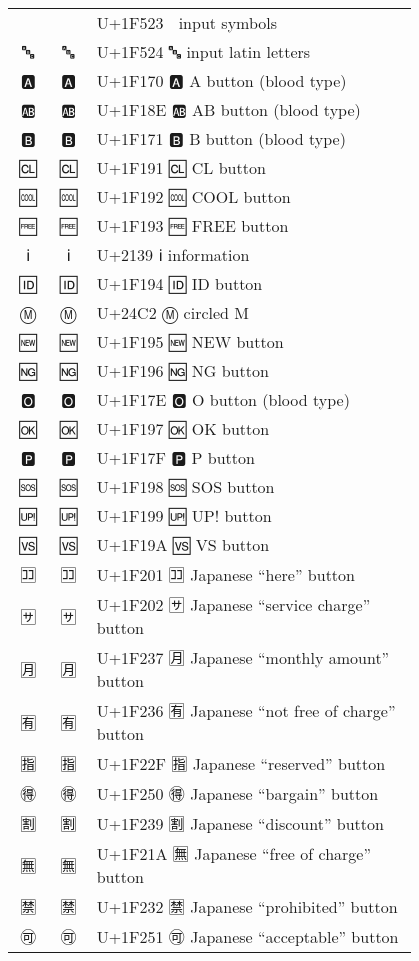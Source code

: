 \documentclass[a4paper,12pt]{article}
\newcommand{\fontA}[1]{{\fontspec[RawFeature={mode=harf,+dist,+ccmp}]{Segoe UI Emoji} #1}}
\newcommand{\fontB}[1]{{\fontspec[RawFeature={mode=harf,+dist,+ccmp}]{Noto Color Emoji} #1}}
\begin{document}
\begin{longtable}[c]{ccp{0.8\linewidth}}
\fontA{🔣}&\fontB{🔣}&U+1F523 🔣 input symbols\\
\fontA{🔤}&\fontB{🔤}&U+1F524 🔤 input latin letters\\
\fontA{🅰}&\fontB{🅰}&U+1F170 🅰 A button (blood type)\\
\fontA{🆎}&\fontB{🆎}&U+1F18E 🆎 AB button (blood type)\\
\fontA{🅱}&\fontB{🅱}&U+1F171 🅱 B button (blood type)\\
\fontA{🆑}&\fontB{🆑}&U+1F191 🆑 CL button\\
\fontA{🆒}&\fontB{🆒}&U+1F192 🆒 COOL button\\
\fontA{🆓}&\fontB{🆓}&U+1F193 🆓 FREE button\\
\fontA{ℹ}&\fontB{ℹ}&U+2139 ℹ information\\
\fontA{🆔}&\fontB{🆔}&U+1F194 🆔 ID button\\
\fontA{Ⓜ}&\fontB{Ⓜ}&U+24C2 Ⓜ circled M\\
\fontA{🆕}&\fontB{🆕}&U+1F195 🆕 NEW button\\
\fontA{🆖}&\fontB{🆖}&U+1F196 🆖 NG button\\
\fontA{🅾}&\fontB{🅾}&U+1F17E 🅾 O button (blood type)\\
\fontA{🆗}&\fontB{🆗}&U+1F197 🆗 OK button\\
\fontA{🅿}&\fontB{🅿}&U+1F17F 🅿 P button\\
\fontA{🆘}&\fontB{🆘}&U+1F198 🆘 SOS button\\
\fontA{🆙}&\fontB{🆙}&U+1F199 🆙 UP! button\\
\fontA{🆚}&\fontB{🆚}&U+1F19A 🆚 VS button\\
\fontA{🈁}&\fontB{🈁}&U+1F201 🈁 Japanese “here” button\\
\fontA{🈂}&\fontB{🈂}&U+1F202 🈂 Japanese “service charge” button\\
\fontA{🈷}&\fontB{🈷}&U+1F237 🈷 Japanese “monthly amount” button\\
\fontA{🈶}&\fontB{🈶}&U+1F236 🈶 Japanese “not free of charge” button\\
\fontA{🈯}&\fontB{🈯}&U+1F22F 🈯 Japanese “reserved” button\\
\fontA{🉐}&\fontB{🉐}&U+1F250 🉐 Japanese “bargain” button\\
\fontA{🈹}&\fontB{🈹}&U+1F239 🈹 Japanese “discount” button\\
\fontA{🈚}&\fontB{🈚}&U+1F21A 🈚 Japanese “free of charge” button\\
\fontA{🈲}&\fontB{🈲}&U+1F232 🈲 Japanese “prohibited” button\\
\fontA{🉑}&\fontB{🉑}&U+1F251 🉑 Japanese “acceptable” button\\

\end{longtable}
\end{document}

